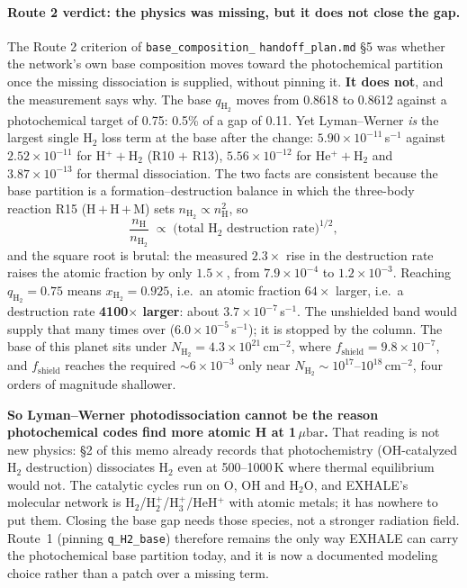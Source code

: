 \documentclass[english,a4paper]{my_memo}
\newcommand{\ubar}{\mu\mathrm{bar}}
\newcommand{\qHH}{q_{\mathrm{H_2}}}
\begin{document}
\paragraph{Route 2 verdict: the physics was missing, but it does not close the
gap.} The Route 2 criterion of \texttt{base\_}\allowbreak\texttt{composition\_}%
\allowbreak\texttt{handoff\_plan.md} \S5 was whether the network's own base composition moves toward the photochemical
partition once the missing dissociation is supplied, without pinning it.
\textbf{It does not}, and the measurement says why. The base $\qHH$ moves from
0.8618 to 0.8612 against a photochemical target of 0.75: 0.5\% of a gap of
0.11. Yet Lyman--Werner \emph{is} the largest single H$_2$ loss term at the base
after the change: $5.90\times10^{-11}$\,s$^{-1}$ against $2.52\times10^{-11}$ for
H$^+ +$H$_2$ (R10 $+$ R13), $5.56\times10^{-12}$ for He$^+ +$H$_2$ and
$3.87\times10^{-13}$ for thermal dissociation. The two facts are consistent
because the base partition is a formation--destruction balance in which the
three-body reaction R15 (H\,$+$\,H\,$+$\,M) sets $n_\mathrm{H_2}\propto
n_\mathrm{H}^{2}$, so
\begin{equation}
  \frac{n_\mathrm{H}}{n_\mathrm{H_2}} \;\propto\;
  \big(\text{total H}_2\text{ destruction rate}\big)^{1/2},
\end{equation}
and the square root is brutal: the measured $2.3\times$ rise in the destruction
rate raises the atomic fraction by only $1.5\times$, from $7.9\times10^{-4}$ to
$1.2\times10^{-3}$. Reaching $\qHH=0.75$ means $x_\mathrm{H_2}=0.925$, i.e.\ an
atomic fraction $64\times$ larger, i.e.\ a destruction rate \textbf{4100$\times$
larger}: about $3.7\times10^{-7}$\,s$^{-1}$. The unshielded band would supply
that many times over ($6.0\times10^{-5}$\,s$^{-1}$); it is stopped by the column.
The base of this planet sits under $N_\mathrm{H_2}=4.3\times10^{21}$\,cm$^{-2}$,
where $f_\mathrm{shield}=9.8\times10^{-7}$, and $f_\mathrm{shield}$ reaches the
required ${\sim}6\times10^{-3}$ only near $N_\mathrm{H_2}\sim10^{17}$--$10^{18}$\,cm$^{-2}$,
four orders of magnitude shallower.

\textbf{So Lyman--Werner photodissociation cannot be the reason photochemical
codes find more atomic H at 1\,$\ubar$.} That reading is not new physics: \S2 of
this memo already records that photochemistry (OH-catalyzed H$_2$ destruction)
dissociates H$_2$ even at 500--1000\,K where thermal equilibrium would not. The
catalytic cycles run on O, OH and H$_2$O, and EXHALE's molecular network is
H$_2$/H$_2^+$/H$_3^+$/HeH$^+$ with atomic metals; it has nowhere to put them.
Closing the base gap needs those species, not a stronger radiation field. Route~1
(pinning \texttt{q\_H2\_base}) therefore remains the only way EXHALE can carry the
photochemical base partition today, and it is now a documented modeling choice
rather than a patch over a missing term.
\end{document}
